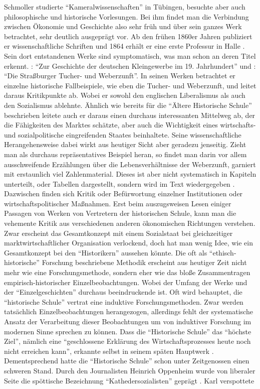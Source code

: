 Schmoller studierte "`Kameralwissenschaften"' in Tübingen, besuchte aber auch philosophische und historische Vorlesungen. Bei ihm findet man die Verbindung zwischen Ökonomie und Geschichte also sehr früh und über sein ganzes Werk betrachtet, sehr deutlich ausgeprägt vor. Ab den frühen 1860er Jahren publiziert er wissenschaftliche Schriften und 1864 erhält er eine erste Professur in Halle \parencite[S. 100]{Winkel1989}. Sein dort entstandenen Werke sind symptomatisch, was man schon an deren Titel erkennt. \textcite{Schmoller1870}: "`Zur Geschichte der deutschen Kleingewerbe im 19. Jahrhundert"' und \textcite{Schmoller1879}: "`Die Straßburger Tucher- und Weberzunft"'. In seinen Werken betrachtet er einzelne historische Fallbeispiele, wie eben die Tucher- und Weberzunft, und leitet daraus Kritikpunkte ab. Wobei er sowohl den englischen Liberalismus als auch den Sozialismus ablehnte. Ähnlich wie bereits für die "`Ältere Historische Schule"' beschrieben leitete auch er daraus einen durchaus interessanten Mittelweg ab, der die Fähigkeiten des Marktes schätzte, aber auch die Wichtigkeit eines wirtschafts- und sozialpolitische eingreifenden Staates beinhaltete. Seine wissenschaftliche Herangehensweise dabei wirkt aus heutiger Sicht aber geradezu jenseitig. Zieht man als durchaus repräsentatives Beispiel \textcite{Schmoller1879} heran, so findet man darin vor allem ausschweifende Erzählungen über die Lebensverhältnisse der Weberzunft, garniert mit erstaunlich viel Zahlenmaterial. Dieses ist aber nicht systematisch in Kapiteln unterteilt, oder Tabellen dargestellt, sondern wird im Text wiedergegeben \parencite[z.B.: S. 199]{Schmoller1879}. Dazwischen finden sich Kritik oder Befürwortung einzelner Institutionen oder wirtschaftspolitischer Maßnahmen. Erst beim auszugsweisen Lesen einiger Passagen von Werken von Vertretern der historischen Schule, kann man die vehemente Kritik aus verschiedenen anderen ökonomischen Richtungen verstehen. Zwar erscheint das Gesamtkonzept mit einem Sozialstaat bei gleichzeitiger marktwirtschaftlicher Organisation verlockend, doch hat man wenig Idee, wie ein Gesamtkonzept bei den "`Historikern"' aussehen könnte. Die oft als "`ethisch-historische"' Forschung beschriebene Methodik erscheint aus heutiger Zeit nicht mehr wie eine Forschungsmethode, sondern eher wie das bloße Zusammentragen empirisch-historischer Einzelbeobachtungen. Wobei der Umfang der Werke und der "`Einzelgeschichten"' durchaus beeindruckende ist. Oft wird behauptet, die "`historische Schule"' vertrat eine induktive Forschungsmethoden. Zwar werden tatsächlich Einzelbeobachtungen herangezogen, allerdings fehlt der systematische Ansatz der Verarbeitung dieser Beobachtungen um von induktiver Forschung im modernen Sinne sprechen zu können. Dass die "`Historische Schule"' das "`höchste Ziel"', nämlich eine "`geschlossene Erklärung des Wirtschaftsprozesses heute noch nicht erreichen kann"', erkannte selbst \textcite{Schmoller1900, Schmoller1904} in seinem späten Hauptwerk \parencite[S. 110]{Winkel1989}. Dementsprechend hatte die "`Historische Schule"' schon unter Zeitgenossen einen schweren Stand. Durch den Journalisten Heinrich Oppenheim wurde von liberaler Seite die spöttische Bezeichnung "`Kathedersozialisten"' geprägt \parencite[S. 102]{Winkel1989}. Karl \textcite[S. 361]{Marx1962} verspottete 